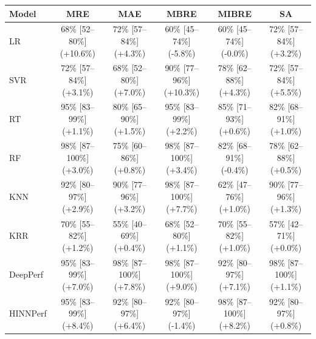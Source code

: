 \begin{tabular}{lccccc}
\toprule
Model & MRE & MAE & MBRE & MIBRE & SA \\
\midrule
LR & 68\% [52--80\%] (+10.6\%) & 72\% [57--84\%] (+4.3\%) & 60\% [45--74\%] (-5.8\%) & 60\% [45--74\%] (-0.0\%) & 72\% [57--84\%] (+3.2\%) \\
SVR & 72\% [57--84\%] (+3.1\%) & 68\% [52--80\%] (+7.0\%) & 90\% [77--96\%] (+10.3\%) & 78\% [62--88\%] (+4.3\%) & 72\% [57--84\%] (+5.5\%) \\
RT & 95\% [83--99\%] (+1.1\%) & 80\% [65--90\%] (+1.5\%) & 95\% [83--99\%] (+2.2\%) & 85\% [71--93\%] (+0.6\%) & 82\% [68--91\%] (+1.0\%) \\
RF & 98\% [87--100\%] (+3.0\%) & 75\% [60--86\%] (+0.8\%) & 98\% [87--100\%] (+3.4\%) & 82\% [68--91\%] (-0.4\%) & 78\% [62--88\%] (+0.5\%) \\
KNN & 92\% [80--97\%] (+2.9\%) & 90\% [77--96\%] (+3.2\%) & 98\% [87--100\%] (+7.7\%) & 62\% [47--76\%] (+1.0\%) & 90\% [77--96\%] (+1.3\%) \\
KRR & 70\% [55--82\%] (+1.2\%) & 55\% [40--69\%] (+0.4\%) & 68\% [52--80\%] (+1.1\%) & 70\% [55--82\%] (+1.0\%) & 57\% [42--71\%] (+0.0\%) \\
DeepPerf & 95\% [83--99\%] (+7.0\%) & 98\% [87--100\%] (+7.8\%) & 98\% [87--100\%] (+9.0\%) & 92\% [80--97\%] (+7.1\%) & 98\% [87--100\%] (+1.1\%) \\
HINNPerf & 95\% [83--99\%] (+8.4\%) & 92\% [80--97\%] (+6.4\%) & 92\% [80--97\%] (-1.4\%) & 98\% [87--100\%] (+8.2\%) & 92\% [80--97\%] (+0.8\%) \\
\bottomrule
\end{tabular}
